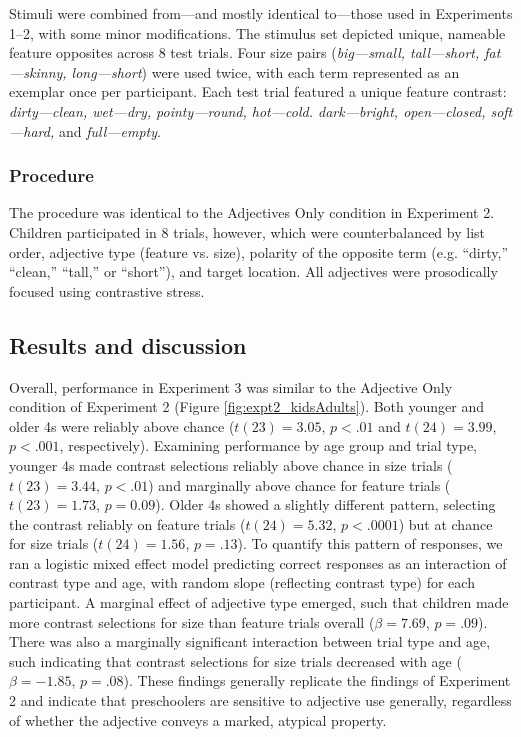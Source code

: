 \documentclass[man]{apa2}
\begin{document}
Stimuli were combined from---and mostly identical to---those used in Experiments 1--2, with some minor modifications. The stimulus set depicted unique, nameable feature opposites across 8 test trials. Four size pairs (\emph{big---small, tall---short, fat---skinny, long---short}) were used twice, with each term represented as an exemplar once per participant.  Each test trial featured a unique feature contrast: \emph{dirty---clean, wet---dry, pointy---round, hot---cold. dark---bright, open---closed, soft---hard,} and \emph{full---empty}.  

\subsubsection{Procedure}

The procedure was identical to the Adjectives Only condition in Experiment 2. Children participated in 8 trials, however, which were counterbalanced by list order, adjective type (feature vs. size), polarity of the opposite term (e.g. ``dirty,'' ``clean,'' ``tall,'' or ``short''), and target location. All adjectives were prosodically focused using contrastive stress. 

\subsection{Results and discussion}

Overall, performance in Experiment 3 was similar to the Adjective Only condition of Experiment 2 (Figure \ref{fig:expt2_kidsAdults}). 
Both younger and older 4s were reliably above chance ($t(23) = 3.05$, $p<.01$ and $t(24) = 3.99$, $p<.001$, respectively). Examining performance by age group and trial type, younger 4s made contrast selections reliably above chance in size trials ($t(23)=3.44$, $p<.01$) and marginally above chance for feature trials ($t(23)=1.73$, $p=0.09$). Older 4s showed a slightly different pattern, selecting the contrast reliably on feature trials ($t(24)=5.32$, $p<.0001$) but at chance for size trials ($t(24)=1.56$, $p=.13$). To quantify this pattern of responses, we ran a logistic mixed effect model predicting correct responses as an interaction of contrast type and age, with random slope (reflecting contrast type) for each participant.  A marginal effect of adjective type emerged, such that children made more contrast selections for size than feature trials overall ($\beta = 7.69$, $p = .09$). There was also a marginally significant interaction between trial type and age, such indicating that contrast selections for size trials decreased with age ($\beta = -1.85$, $p = .08$). These findings generally replicate the findings of Experiment 2 and indicate that preschoolers are sensitive to adjective use generally, regardless of whether the adjective conveys a marked, atypical property.
\end{document}

